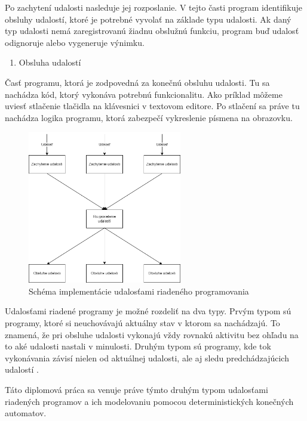 \noindent \par
Po zachytení udalosti nasleduje jej rozposlanie. V tejto časti program identifikuje obsluhy udalostí, ktoré je potrebné vyvolať na základe typu udalosti. Ak daný typ udalosti nemá zaregistrovanú žiadnu obslužnú funkciu, program buď udalosť odignoruje alebo vygeneruje výnimku.

\begin{enumerate}[resume]
  \item Obsluha udalostí
\end{enumerate}

\noindent \par
Časť programu, ktorá je zodpovedná za konečnú obsluhu udalosti. Tu sa nachádza kód, ktorý vykonáva potrebnú funkcionalitu. Ako príklad môžeme uviesť stlačenie tlačidla na klávesnici v textovom editore. Po stlačení sa práve tu nachádza logika programu, ktorá zabezpečí vykreslenie písmena na obrazovku.

\begin{figure}[!htbp]
  \centering
  \includegraphics[width=0.60\textwidth]{img/event-driven-schema.png}
  \caption{Schéma implementácie udalosťami riadeného programovania}
  \label{figure:event-driven-schema}
\end{figure}

\par
Udalosťami riadené programy je možné rozdeliť na dva typy. Prvým typom sú programy, ktoré si neuchovávajú aktuálny stav v ktorom sa nachádzajú. To znamená, že pri obsluhe udalosti vykonajú vždy rovnakú aktivitu bez ohľadu na to aké udalosti nastali v minulosti. Druhým typom sú programy, kde tok vykonávania závisí nielen od aktuálnej udalosti, ale aj sledu predchádzajúcich udalostí \cite{dashEventDrivenProgramming2011}.
\par Táto diplomová práca sa venuje práve týmto druhým typom udalosťami riadených programov a ich modelovaniu pomocou deterministických konečných automatov.